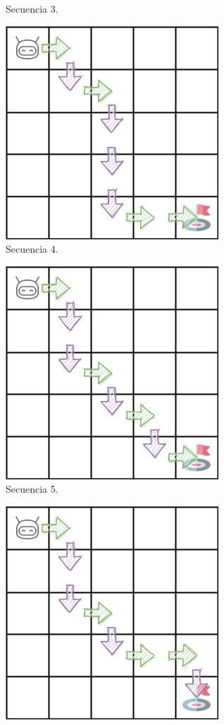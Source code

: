\begin{figure}
\begin{subfigure}{.35\textwidth}
        \caption{Secuencia 3.}
        \label{fig:seq3}
    \end{subfigure}
    \begin{subfigure}{.35\textwidth}
        \centering
        \includegraphics[scale=0.4]{cap5_experimentacion/images/dim5_lr0.01_ep0.7_30.png}
        \caption{Secuencia 4.}
        \label{fig:seq4}
    \end{subfigure}%
    \begin{subfigure}{.35\textwidth}
        \centering
        \includegraphics[scale=0.4]{cap5_experimentacion/images/dim5_lr0.01_ep1_153.png}
        \caption{Secuencia 5.}
        \label{fig:seq5}
    \end{subfigure}%
    \begin{subfigure}{.35\textwidth}
        \centering
        \includegraphics[scale=0.4]{cap5_experimentacion/images/dim5_lr0.01_ep1_51.png}

\end{subfigure}
\end{figure}
